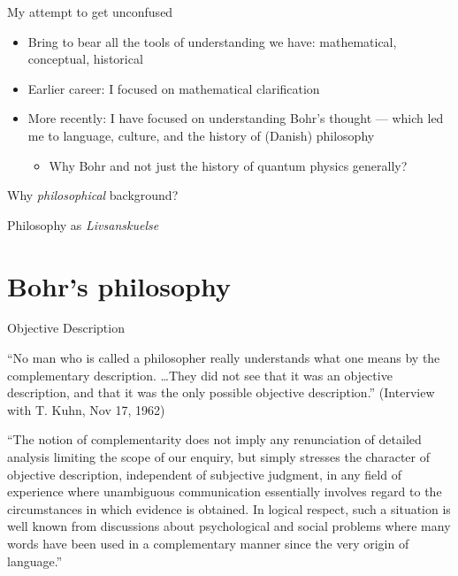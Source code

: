 \documentclass[fleqn]{beamer}
\begin{document}
\begin{frame}{My attempt to get unconfused}

  \begin{itemize}
  \item Bring to bear all the tools of understanding we have:
    mathematical, conceptual, historical
  \item Earlier career: I focused on mathematical clarification
  \item More recently: I have focused on understanding Bohr's thought
    --- which led me to language, culture, and the history of (Danish)
    philosophy
    \begin{itemize}
    \item Why Bohr and not just the history of quantum physics
      generally?
    \end{itemize}
  \end{itemize}

\end{frame}

\begin{frame}{Why \emph{philosophical} background?}

  {\Huge Philosophy as \emph{Livsanskuelse} }



\end{frame}

\section{Bohr's philosophy}

\begin{frame}{Objective Description}
  
  ``No man who is called a philosopher really understands what one
  means by the complementary description. \dots They did not see that
  it was an objective description, and that it was the only possible
  objective description.'' (Interview with T. Kuhn, Nov 17, 1962)

\end{frame}

\begin{frame}{\mbox{}}

  ``The notion of complementarity does not imply any renunciation of
  detailed analysis limiting the scope of our enquiry, but simply
  stresses the character of objective description, independent of
  subjective judgment, in any field of experience where unambiguous
  communication essentially involves regard to the circumstances in
  which evidence is obtained. In logical respect, such a situation is
  well known from discussions about psychological and social problems
  where many words have been used in a complementary manner since the
  very origin of language.'' \citep[1105]{rutherford}


\nocite{koch2016danske}

\end{frame}
\end{document}
